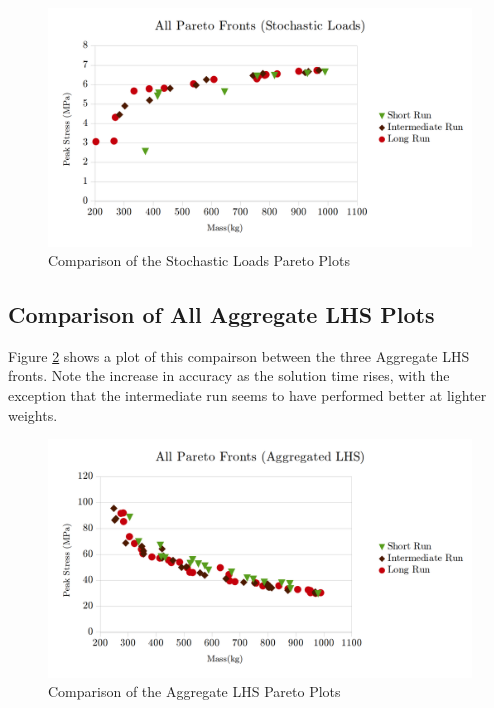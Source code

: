 \begin{figure}[!htb]
\includegraphics[width=\textwidth]{img/pf_comp_sto.png}
\caption{Comparison of the Stochastic Loads Pareto Plots}
\label{fig:pfront_comp_sto}
\end{figure}

\subsection{Comparison of All Aggregate LHS Plots}
Figure \ref{fig:pfront_comp_agg} shows a plot of this compairson between the three Aggregate LHS fronts. Note the increase in accuracy as the solution time rises, with the exception that the intermediate run seems to have performed better at lighter weights. 

\begin{figure}[!htb]
\includegraphics[width=\textwidth]{img/pf_comp_agg.png}
\caption{Comparison of the Aggregate LHS Pareto Plots}
\label{fig:pfront_comp_agg}
\end{figure}
